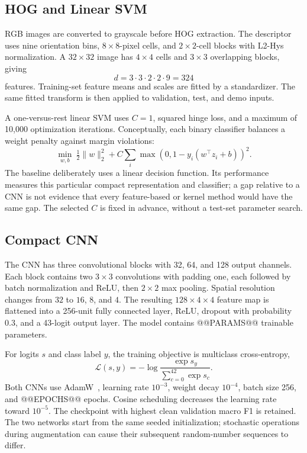 \documentclass[conference]{IEEEtran}
\begin{document}
\subsection{HOG and Linear SVM}
RGB images are converted to grayscale before HOG extraction. The descriptor uses nine orientation bins, $8\times8$-pixel cells, and $2\times2$-cell blocks with L2-Hys normalization. A $32\times32$ image has $4\times4$ cells and $3\times3$ overlapping blocks, giving
\begin{equation}
d=3\cdot3\cdot2\cdot2\cdot9=324
\end{equation}
features. Training-set feature means and scales are fitted by a standardizer. The same fitted transform is then applied to validation, test, and demo inputs.

A one-versus-rest linear SVM uses $C=1$, squared hinge loss, and a maximum of 10,000 optimization iterations. Conceptually, each binary classifier balances a weight penalty against margin violations:
\begin{equation}
\min_{w,b}\ \tfrac12\lVert w\rVert_2^2+C\sum_i\max(0,1-y_i(w^\top z_i+b))^2.
\end{equation}
The baseline deliberately uses a linear decision function. Its performance measures this particular compact representation and classifier; a gap relative to a CNN is not evidence that every feature-based or kernel method would have the same gap. The selected $C$ is fixed in advance, without a test-set parameter search.

\subsection{Compact CNN}
The CNN has three convolutional blocks with 32, 64, and 128 output channels. Each block contains two $3\times3$ convolutions with padding one, each followed by batch normalization and ReLU, then $2\times2$ max pooling. Spatial resolution changes from $32$ to $16$, $8$, and $4$. The resulting $128\times4\times4$ feature map is flattened into a 256-unit fully connected layer, ReLU, dropout with probability 0.3, and a 43-logit output layer. The model contains @@PARAMS@@ trainable parameters.

For logits $s$ and class label $y$, the training objective is multiclass cross-entropy,
\begin{equation}
\mathcal{L}(s,y)=-\log\frac{\exp s_y}{\sum_{c=0}^{42}\exp s_c}.
\end{equation}
Both CNNs use AdamW~\cite{adamw}, learning rate $10^{-3}$, weight decay $10^{-4}$, batch size 256, and @@EPOCHS@@ epochs. Cosine scheduling decreases the learning rate toward $10^{-5}$. The checkpoint with highest clean validation macro F1 is retained. The two networks start from the same seeded initialization; stochastic operations during augmentation can cause their subsequent random-number sequences to differ.
\end{document}
